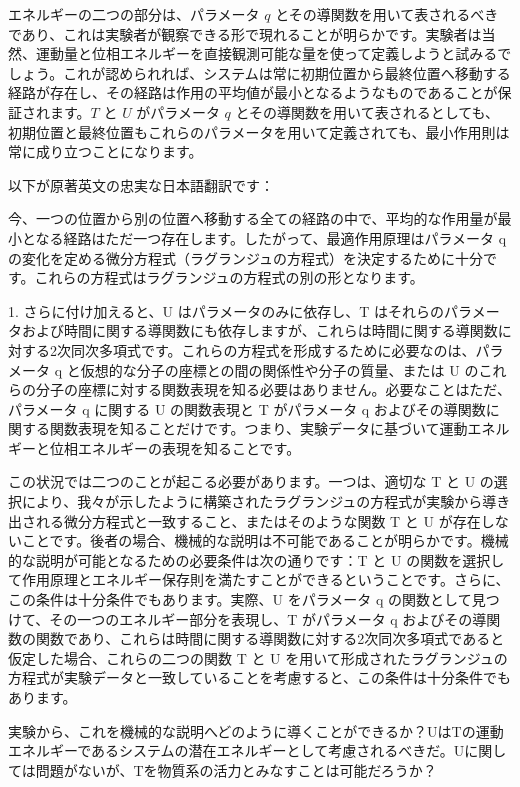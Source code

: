 \documentclass[a4paper,11pt,openany]{ltjsbook}
\begin{document}
エネルギーの二つの部分は、パラメータ \(q\) とその導関数を用いて表されるべきであり、これは実験者が観察できる形で現れることが明らかです。実験者は当然、運動量と位相エネルギーを直接観測可能な量を使って定義しようと試みるでしょう。これが認められれば、システムは常に初期位置から最終位置へ移動する経路が存在し、その経路は作用の平均値が最小となるようなものであることが保証されます。\(T\) と \(U\) がパラメータ \(q\) とその導関数を用いて表されるとしても、初期位置と最終位置もこれらのパラメータを用いて定義されても、最小作用則は常に成り立つことになります。

以下が原著英文の忠実な日本語翻訳です：

今、一つの位置から別の位置へ移動する全ての経路の中で、平均的な作用量が最小となる経路はただ一つ存在します。したがって、最適作用原理はパラメータ q の変化を定める微分方程式（ラグランジュの方程式）を決定するために十分です。これらの方程式はラグランジュの方程式の別の形となります。

1. さらに付け加えると、U はパラメータのみに依存し、T はそれらのパラメータおよび時間に関する導関数にも依存しますが、これらは時間に関する導関数に対する2次同次多項式です。これらの方程式を形成するために必要なのは、パラメータ q と仮想的な分子の座標との間の関係性や分子の質量、または U のこれらの分子の座標に対する関数表現を知る必要はありません。必要なことはただ、パラメータ q に関する U の関数表現と T がパラメータ q およびその導関数に関する関数表現を知ることだけです。つまり、実験データに基づいて運動エネルギーと位相エネルギーの表現を知ることです。

この状況では二つのことが起こる必要があります。一つは、適切な T と U の選択により、我々が示したように構築されたラグランジュの方程式が実験から導き出される微分方程式と一致すること、またはそのような関数 T と U が存在しないことです。後者の場合、機械的な説明は不可能であることが明らかです。機械的な説明が可能となるための必要条件は次の通りです：T と U の関数を選択して作用原理とエネルギー保存則を満たすことができるということです。さらに、この条件は十分条件でもあります。実際、U をパラメータ q の関数として見つけて、その一つのエネルギー部分を表現し、T がパラメータ q およびその導関数の関数であり、これらは時間に関する導関数に対する2次同次多項式であると仮定した場合、これらの二つの関数 T と U を用いて形成されたラグランジュの方程式が実験データと一致していることを考慮すると、この条件は十分条件でもあります。

実験から、これを機械的な説明へどのように導くことができるか？UはTの運動エネルギーであるシステムの潜在エネルギーとして考慮されるべきだ。Uに関しては問題がないが、Tを物質系の活力とみなすことは可能だろうか？
\end{document}
